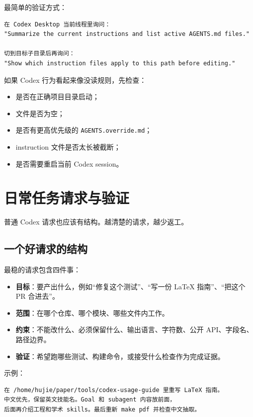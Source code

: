 \documentclass[UTF8,a4paper,11pt,fontset=none]{ctexart}
\newcommand{\file}[1]{\texttt{#1}}
\newcommand{\keypoint}[1]{\textbf{#1}}
\begin{document}
最简单的验证方式：

\begin{lstlisting}
在 Codex Desktop 当前线程里询问：
"Summarize the current instructions and list active AGENTS.md files."

切到目标子目录后再询问：
"Show which instruction files apply to this path before editing."
\end{lstlisting}

如果 Codex 行为看起来像没读规则，先检查：

\begin{itemize}
  \item 是否在正确项目目录启动；
  \item 文件是否为空；
  \item 是否有更高优先级的 \file{AGENTS.override.md}；
  \item instruction 文件是否太长被截断；
  \item 是否需要重启当前 Codex session。
\end{itemize}

\section{日常任务请求与验证}

普通 Codex 请求也应该有结构。越清楚的请求，越少返工。

\subsection{一个好请求的结构}

最稳的请求包含四件事：

\begin{itemize}
  \item \keypoint{目标}：要产出什么，例如“修复这个测试”、“写一份 LaTeX 指南”、“把这个 PR 合进去”。
  \item \keypoint{范围}：在哪个仓库、哪个模块、哪些文件内工作。
  \item \keypoint{约束}：不能改什么、必须保留什么、输出语言、字符数、公开 API、字段名、路径边界。
  \item \keypoint{验证}：希望跑哪些测试、构建命令，或接受什么检查作为完成证据。
\end{itemize}

示例：

\begin{lstlisting}
在 /home/hujie/paper/tools/codex-usage-guide 里重写 LaTeX 指南。
中文优先，保留英文技能名。Goal 和 subagent 内容放前面，
后面再介绍工程和学术 skills。最后重新 make pdf 并检查中文抽取。
\end{lstlisting}
\end{document}
